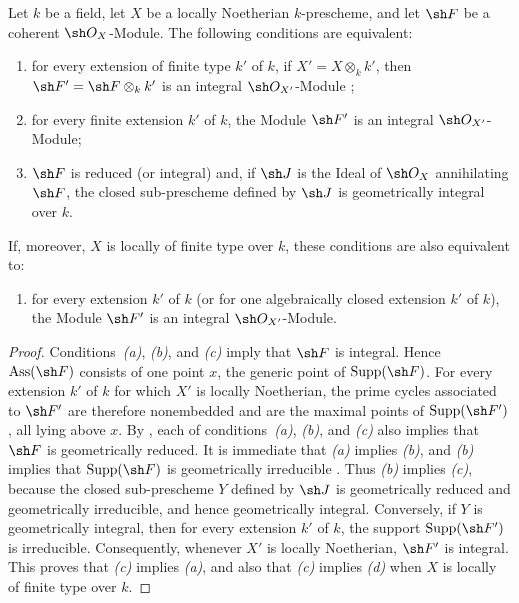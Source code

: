 \begin{proposition}[4.6.18]
\label{IV.4.6.18}
Let $k$ be a field, let $X$ be a locally Noetherian $k$-prescheme,
and let $\sh F$ be a coherent $\sh O_X$-Module.
The following conditions are equivalent:
\begin{enumerate}
\item[\rm(a)]
\label{IV.4.6.18.a}
for every extension of finite type $k'$ of $k$, if
$X'=X\otimes_k k'$, then
$\sh F'=\sh F\otimes_k k'$ is an integral
$\sh O_{X'}$-Module ;

\item[\rm(b)]
\label{IV.4.6.18.b}
for every finite extension $k'$ of $k$, the Module $\sh F'$ is an
integral $\sh O_{X'}$-Module;

\item[\rm(c)]
\label{IV.4.6.18.c}
$\sh F$ is reduced (or integral) and, if $\sh J$ is the Ideal of
$\sh O_X$ annihilating $\sh F$, the closed sub-prescheme defined by
$\sh J$ is geometrically integral over $k$.
\end{enumerate}
If, moreover, $X$ is locally of finite type over $k$, these conditions
are also equivalent to:
\begin{enumerate}
\item[\rm(d)]
\label{IV.4.6.18.d}
for every extension $k'$ of $k$
(or for one algebraically closed extension $k'$ of $k$), the Module
$\sh F'$ is an integral $\sh O_{X'}$-Module.
\end{enumerate}
\end{proposition}

\begin{proof}
Conditions~\emph{(a)}, \emph{(b)}, and \emph{(c)} imply that $\sh F$
is integral.
Hence $\operatorname{Ass}(\sh F)$ consists of one point $x$, the
generic point of $\operatorname{Supp}(\sh F)$.
For every extension $k'$ of $k$ for which $X'$ is locally
Noetherian, the prime cycles associated to $\sh F'$ are therefore
nonembedded and are the maximal points of
$\operatorname{Supp}(\sh F')$, all lying above $x$.
By , each of conditions~\emph{(a)}, \emph{(b)}, and
\emph{(c)} also implies that $\sh F$ is geometrically reduced.
It is immediate that \emph{(a)} implies \emph{(b)}, and
\emph{(b)} implies that $\operatorname{Supp}(\sh F)$ is geometrically
irreducible .
Thus \emph{(b)} implies \emph{(c)}, because the closed sub-prescheme
$Y$ defined by $\sh J$ is geometrically reduced and geometrically
irreducible, and hence geometrically integral.
Conversely, if $Y$ is geometrically integral, then for every extension
$k'$ of $k$, the support $\operatorname{Supp}(\sh F')$ is
irreducible.
Consequently, whenever $X'$ is locally Noetherian, $\sh F'$ is
integral.
This proves that \emph{(c)} implies \emph{(a)}, and also that
\emph{(c)} implies \emph{(d)} when $X$ is locally of finite type over
$k$.
\end{proof}

